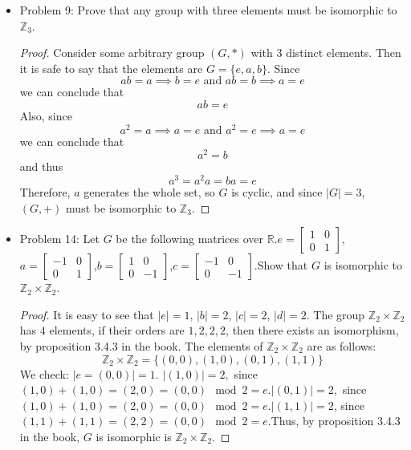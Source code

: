 \documentclass[hidelinks,12pt]{article}
\newcommand{\R}{\mathbb{R}}
\newcommand{\Z}{\mathbb{Z}}
\begin{document}
\begin{itemize}
\begin{proof}
    \end{proof}
    \item Problem 9: Prove that any group with three elements must be isomorphic to $\Z_3$.\begin{proof}
    Consider some arbitrary group $(G,*)$ with 3 distinct elements. Then it is safe to say that the elements are $G=\{e,a,b\}$. Since $$ab=a\implies b=e\text{ and }ab=b\implies a=e$$ we can conclude that $$ab=e$$ Also, since $$a^2=a\implies a=e\text{ and }a^2=e\implies a=e$$ we can conclude that $$a^2=b$$ and thus $$a^3=a^2a=ba=e$$ Therefore, $a$ generates the whole set, so $G$ is cyclic, and since $|G|=3$, $(G,+)$ must be isomorphic to $\Z_3$.
    \end{proof}
    \item Problem 14: Let $G$ be the following matrices over $\R$.\newline $e=\begin{bmatrix}
1 & 0\\
0 & 1
\end{bmatrix}$,$a=\begin{bmatrix}
-1 & 0\\
0 & 1
\end{bmatrix}$,$b=\begin{bmatrix}
1 & 0\\
0 & -1
\end{bmatrix}$,$c=\begin{bmatrix}
-1 & 0\\
0 & -1
\end{bmatrix}$.\newline Show that $G$ is isomorphic to $\Z_2\times\Z_2$.\begin{proof}It is easy to see that $|e|=1$, $|b|=2$, $|c|=2$, $|d|=2$. The group $\Z_2\times\Z_2$ has $4$ elements, if their orders are $1,2,2,2$, then there exists an isomorphism, by proposition 3.4.3 in the book. The elements of $\Z_2\times\Z_2$ are as follows:$$\Z_2\times\Z_2=\{(0,0),(1,0),(0,1),(1,1)\}$$We check: \newline $|e=(0,0)|=1$. \newline $|(1,0)|=2,$ since $(1,0)+(1,0)=(2,0)=(0,0)\mod2=e$.\newline $|(0,1)|=2,$ since $(1,0)+(1,0)=(2,0)=(0,0)\mod2=e$.\newline $|(1,1)|=2$, since $(1,1)+(1,1)=(2,2)=(0,0)\mod2=e$.\newline Thus, by proposition 3.4.3 in the book, $G$ is isomorphic is $\Z_2\times\Z_2$.\end{proof}
\end{itemize}
\end{document}
